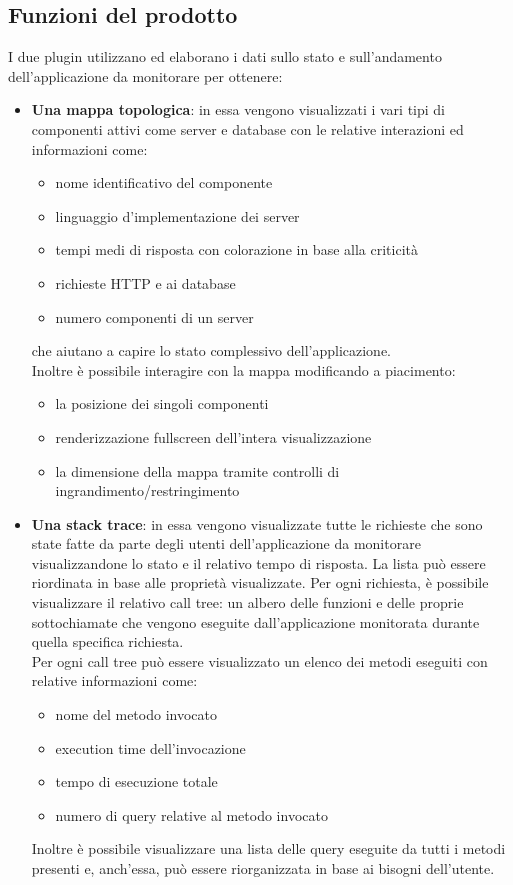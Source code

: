 	\subsection{Funzioni del prodotto}
	I due plugin utilizzano ed elaborano i dati sullo stato e sull'andamento dell'applicazione da monitorare per ottenere:
	\begin{itemize}
		\item 	\textbf{Una mappa topologica}: in essa vengono visualizzati i vari tipi di componenti attivi come server e database con le relative interazioni ed informazioni come: 
		\begin{itemize}
					\item nome identificativo del componente
					\item linguaggio d'implementazione dei server
					\item tempi medi di risposta con colorazione in base alla criticità
					\item richieste HTTP e ai database
					\item numero componenti di un server 
		\end{itemize}
		che aiutano a capire lo stato complessivo dell'applicazione. \\
		Inoltre è possibile interagire con la mappa modificando a piacimento:
		\begin{itemize}
					\item la posizione dei singoli componenti
					\item renderizzazione fullscreen dell'intera visualizzazione
					\item la dimensione della mappa tramite controlli di ingrandimento/restringimento		
		\end{itemize}
		\item \textbf{Una stack trace}: in essa vengono visualizzate tutte le richieste che sono state fatte da parte degli utenti dell'applicazione da monitorare visualizzandone lo stato e il relativo tempo di risposta. La lista può essere riordinata in base alle proprietà visualizzate.
		Per ogni richiesta, è possibile visualizzare il relativo call tree: un albero delle funzioni e delle proprie sottochiamate che vengono eseguite dall'applicazione monitorata durante quella specifica richiesta. \\
		Per ogni call tree può essere visualizzato un elenco dei metodi eseguiti con relative informazioni come:
		\begin{itemize}
			\item nome del metodo invocato
			\item execution time dell'invocazione
			\item tempo di esecuzione totale
			\item numero di query relative al metodo invocato
		\end{itemize}
		 Inoltre è possibile visualizzare una lista delle query eseguite da tutti i metodi presenti e, anch'essa, può essere riorganizzata in base ai bisogni dell'utente.
	\end{itemize} 
